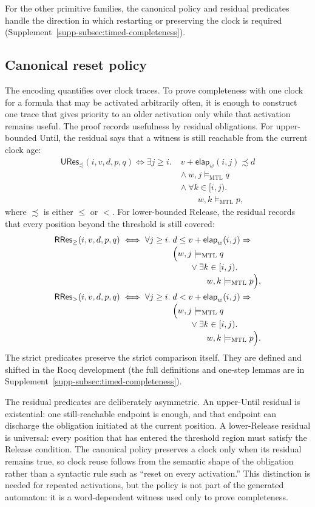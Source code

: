 \documentclass[10pt,journal,compsoc]{IEEEtran}
\newcommand{\satM}{\models_{\mathrm{MTL}}}
\newcommand{\elapsed}{\mathsf{elap}}
\begin{document}
For the other primitive families, the canonical policy and residual
predicates handle the direction in which restarting or preserving the clock
is required (Supplement~\ref{supp-subsec:timed-completeness}).

\subsection{Canonical reset policy}
\label{subsec:canonical-main}
The encoding quantifies over clock traces. To prove completeness with one
clock for a formula that may be activated arbitrarily often, it is enough to
construct one trace that gives priority to an older activation only while
that activation remains useful. The proof records usefulness by residual
obligations. For upper-bounded Until, the residual says that a witness is
still reachable from the current clock age:
\begin{align*}
\mathsf{URes}_{\precsim}(i,v,d,p,q)\iff
\exists j\ge i.\;&v+\elapsed_w(i,j)\precsim d\\[-1mm]
&\land\ w,j\satM q\\[-1mm]
&\land\ \forall k\in[i,j).\\[-1mm]
&\qquad w,k\satM p,
\end{align*}
where $\precsim$ is either $\le$ or $<$. For lower-bounded Release, the
residual records that every position beyond the threshold is still covered:
\begin{align*}
\mathsf{RRes}_{\ge}(i,v,d,p,q)\iff
\forall j\ge i.\;&d\le v+\elapsed_w(i,j)\Rightarrow\\[-1mm]
&\Bigl(w,j\satM q\\[-1mm]
&\qquad\lor\exists k\in[i,j).\\[-1mm]
&\qquad\qquad w,k\satM p\Bigr),\\
\mathsf{RRes}_{>}(i,v,d,p,q)\iff
\forall j\ge i.\;&d<v+\elapsed_w(i,j)\Rightarrow\\[-1mm]
&\Bigl(w,j\satM q\\[-1mm]
&\qquad\lor\exists k\in[i,j).\\[-1mm]
&\qquad\qquad w,k\satM p\Bigr).
\end{align*}
The strict predicates preserve the strict comparison itself. They are
defined and shifted in the Rocq development (the full definitions and
one-step lemmas are in Supplement~\ref{supp-subsec:timed-completeness}).

The residual predicates are deliberately asymmetric. An upper-Until residual
is existential: one still-reachable endpoint is enough, and that endpoint
can discharge the obligation initiated at the current position. A
lower-Release residual is universal: every position that has entered the
threshold region must satisfy the Release condition. The canonical policy
preserves a clock only when its residual remains true, so clock reuse follows
from the semantic shape of the obligation rather than a syntactic rule such
as “reset on every activation.” This distinction is needed for repeated
activations, but the policy is not part of the generated automaton: it is a
word-dependent witness used only to prove completeness.
\end{document}
